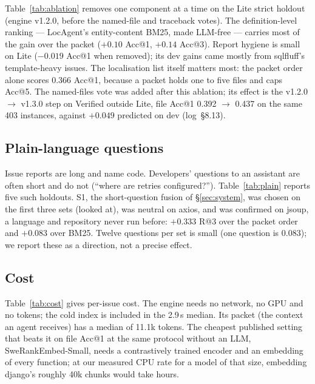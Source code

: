 \documentclass[10pt,twocolumn]{article}
\makeatletter
\newcommand{\accat}[1]{Acc@#1}
\makeatother
\begin{document}
Table~\ref{tab:ablation} removes one component at a time on the Lite strict holdout (engine v1.2.0,
before the named-file and traceback votes). The definition-level ranking --- LocAgent's
entity-content BM25, made LLM-free --- carries most of the gain over the packet ($+0.10$ \accat{1},
$+0.14$ \accat{3}). Report hygiene is small on Lite ($-0.019$ \accat{1} when removed); its dev gains
came mostly from sqlfluff's template-heavy issues. The localisation list itself matters most: the
packet order alone scores 0.366 \accat{1}, because a packet holds one to five files and caps
\accat{5}. The named-files vote was added after this ablation; its effect is the v1.2.0 $\to$ v1.3.0
step on Verified outside Lite, file \accat{1} 0.392 $\to$ 0.437 on the same 403 instances, against
$+0.049$ predicted on dev (log~\S8.13).

\subsection{Plain-language questions}
\label{sec:plain}



Issue reports are long and name code. Developers' questions to an assistant are often short and do
not (``where are retries configured?''). Table~\ref{tab:plain} reports five such holdouts. S1, the
short-question fusion of \S\ref{sec:system}, was chosen on the first three sets (looked at), was
neutral on axios, and was confirmed on jsoup, a language and repository never run before:
$+0.333$ R@3 over the packet order and $+0.083$ over BM25. Twelve questions per set is small (one
question is 0.083); we report these as a direction, not a precise effect.

\subsection{Cost}
\label{sec:cost}



Table~\ref{tab:cost} gives per-issue cost. The engine needs no network, no GPU and no tokens; the
cold index is included in the 2.9\,s median. Its packet (the context an agent receives) has a median
of 11.1k tokens. The cheapest published setting that beats it on file \accat{1} at the same protocol
without an LLM, SweRankEmbed-Small, needs a contrastively trained encoder and an embedding of every
function; at our measured CPU rate for a model of that size, embedding django's roughly 40k chunks
would take hours.
\end{document}
